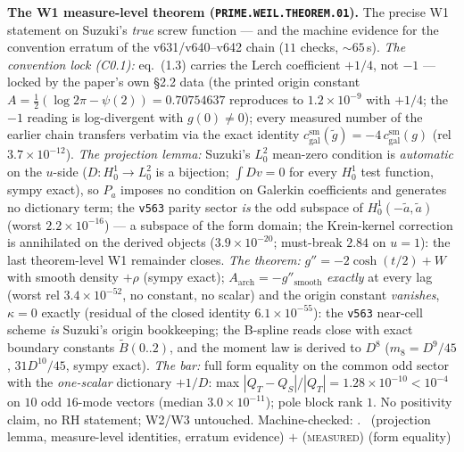\par\smallskip\noindent\textbf{The W1 measure-level theorem
(\texttt{PRIME.WEIL.THEOREM.01}).}
The precise W1 statement on Suzuki's \emph{true} screw function ---
and the machine evidence for the convention erratum of the
v631/v640--v642 chain ($11$ checks, ${\sim}65$\,s).  \emph{The
convention lock (C0.1):} eq.~(1.3) carries the Lerch coefficient
$+1/4$, not $-1$ --- locked by the paper's own \S2.2 data (the printed
origin constant $A=\tfrac12(\log2\pi-\psi(2))=0.70754637$ reproduces
to $1.2\times10^{-9}$ with $+1/4$; the $-1$ reading is log-divergent
with $g(0)\ne0$); every measured number of the earlier chain transfers
verbatim via the exact identity
$c^{\mathrm{sm}}_{\mathrm{gal}}(\tilde g)=-4\,c^{\mathrm{sm}}_{\mathrm{gal}}(g)$
(rel $3.7\times10^{-12}$).  \emph{The projection lemma:} Suzuki's
$L^2_0$ mean-zero condition is \emph{automatic} on the $u$-side
($D:H^1_0\to L^2_0$ is a bijection; $\int Dv=0$ for every $H^1_0$
test function, sympy exact), so $P_a$ imposes no condition on Galerkin
coefficients and generates no dictionary term; the \texttt{v563}
parity sector \emph{is} the odd subspace of
$H^1_0(-\tilde a,\tilde a)$ (worst $2.2\times10^{-16}$) --- a subspace
of the form domain; the Krein-kernel correction is annihilated on the
derived objects ($3.9\times10^{-20}$; must-break $2.84$ on $u=1$):
the last theorem-level W1 remainder closes.  \emph{The theorem:}
$g''=-2\cosh(t/2)+W$ with smooth density $+\rho$ (sympy exact);
$A_{\mathrm{arch}}=-g''_{\mathrm{smooth}}$ \emph{exactly} at every lag
(worst rel $3.4\times10^{-52}$, no constant, no scalar) and the origin
constant \emph{vanishes}, $\kappa=0$ exactly (residual of the closed
identity $6.1\times10^{-55}$): the \texttt{v563} near-cell scheme
\emph{is} Suzuki's origin bookkeeping; the B-spline reads close with
exact boundary constants $\tilde B(0..2)$, and the moment law is
derived to $D^8$ ($m_8=D^9/45$, $31D^{10}/45$, sympy exact).
\emph{The bar:} full form equality on the common odd sector with the
\emph{one-scalar} dictionary $+1/D$: max
$|Q_T-Q_S|/|Q_T|=1.28\times10^{-10}<10^{-4}$ on $10$ odd $16$-mode
vectors (median $3.0\times10^{-11}$); pole block rank $1$.  No
positivity claim, no RH statement; W2/W3 untouched.
Machine-checked: .
\mE\ (projection lemma, measure-level identities, erratum evidence)
$+$ (\textsc{measured}) (form equality)
\par\smallskip



